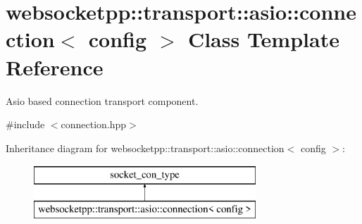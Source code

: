 \hypertarget{classwebsocketpp_1_1transport_1_1asio_1_1connection}{}\section{websocketpp\+:\+:transport\+:\+:asio\+:\+:connection$<$ config $>$ Class Template Reference}
\label{classwebsocketpp_1_1transport_1_1asio_1_1connection}


Asio based connection transport component.  




{\ttfamily \#include $<$connection.\+hpp$>$}

Inheritance diagram for websocketpp\+:\+:transport\+:\+:asio\+:\+:connection$<$ config $>$\+:\begin{figure}[H]
\begin{center}
\leavevmode
\includegraphics[height=2.000000cm]{classwebsocketpp_1_1transport_1_1asio_1_1connection}
\end{center}
\end{figure}
